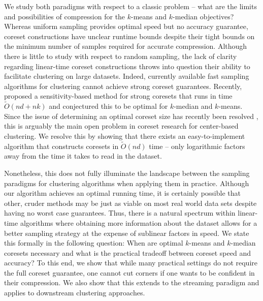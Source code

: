 We study both paradigms with respect to a classic problem -- what are the limits and possibilities of compression for the $k$-means and $k$-median objectives?
Whereas uniform sampling provides optimal speed but no accuracy guarantee, coreset constructions have
unclear runtime bounds despite their tight bounds on the minimum number of samples required for accurate compression. Although there is little to study with respect to random
sampling, the lack of clarity regarding linear-time coreset constructions throws into question their ability to facilitate clustering on large datasets. Indeed,
currently available fast sampling algorithms for clustering \cite{BachemL018} \cite{kmeans_sublinear_bachem16} cannot achieve strong coreset guarantees.
Recently, \cite{DSWY22} proposed a sensitivity-based method for strong coresets that runs in time
$\tilde{O}(nd + nk)$ and conjectured this to be optimal for $k$-median and $k$-means.  Since the issue of determining an optimal coreset size has recently
been resolved \cite{CSS21,CLSSS22,HLW23}, this is arguably the main open problem in coreset research for center-based clustering. We resolve this by showing that
there exists an easy-to-implement algorithm that constructs coresets in $\tilde{O}(nd)$ time -- only logarithmic factors away from the time it takes to read in
the dataset.

Nonetheless, this does not fully illuminate the landscape between the sampling paradigms for clustering algorithms when applying them in practice. Although our algorithm achieves an optimal
running time, it is certainly possible that other, cruder methods may be just as viable on most real world data sets despite having no worst case guarantees.
Thus, there is a natural spectrum within linear-time algorithms where obtaining more information about the dataset allows for a better
sampling strategy at the expense of sublinear factors in speed. We state this formally in the following question: When are optimal $k$-means and $k$-median
coresets necessary and what is the practical tradeoff between coreset speed and accuracy? To this end, we show that while many practical settings do not require
the full coreset guarantee, one cannot cut corners if one wants to be confident in their compression. We also
show that this extends to the streaming paradigm and applies to downstream clustering approaches.

